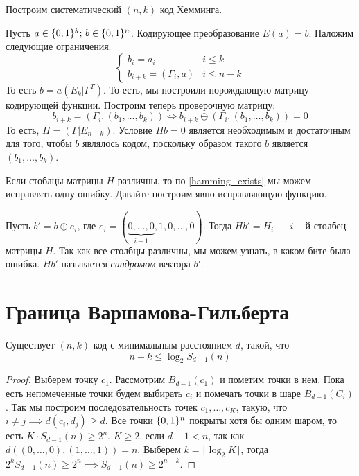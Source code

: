 \begin{example}
Построим систематический $(n,k)$ код Хемминга. 

Пусть $a \in \{0,1\}^k;\, b \in \{0,1\}^n$. Кодирующее преобразование $E(a) = b$.
Наложим следующие ограничения:
$$\left\{ \begin{array}{lr}
             b_i = a_i & i \le k \\
             b_{i+k} = (\Gamma_i, a) & i \le n-k
          \end{array}\right. $$
То есть $b = a (E_k | \Gamma^{T})$. То есть, мы построили порождающую матрицу
кодирующей функции. Построим теперь проверочную матрицу:
$$b_{i+k} = (\Gamma_i, (b_1, \ldots, b_k)) \iff 
 b_{i+k} \oplus (\Gamma_i, (b_1, \ldots, b_k)) = 0$$
То есть, $H = (\Gamma | E_{n-k})$. Условие $Hb = 0$ является необходимым и достаточным
для того, чтобы $b$ являлось кодом, поскольку образом такого $b$ является 
$(b_1, \ldots, b_k)$.

Если стоблцы матрицы $H$ различны, то по \ref{hamming_exists} мы можем исправлять 
одну ошибку. Давайте построим явно исправляющую функцию.

Пусть $b' = b \oplus e_i$, где $e_i = (\underbrace{0, \ldots, 0}_{i-1}, 1, 0, \ldots, 0)$.
Тогда $Hb' = H_i$ --- $i-й$ столбец матрицы $H$. Так как все столбцы различны,
мы можем узнать, в каком бите была ошибка. $Hb'$ называется
\emph{синдромом} вектора $b'$.
\end{example}

\section{Граница Варшамова-Гильберта}

\begin{theorem}
Существует $(n,k)$-код с минимальным расстоянием $d$, такой, что 
$$n-k \le \log_2 S_{d-1} (n)$$
\end{theorem}
\begin{proof}
Выберем точку $c_1$. Рассмотрим $B_{d-1}(c_1)$ и пометим точки в нем. Пока есть
непомеченные точки будем выбирать $c_i$ и помечать точки в шаре $B_{d-1}(C_i)$.
Так мы построим последовательность точек $c_1, \ldots, c_K$, такую, что 
$i\neq j \implies d(c_i, d_j) \ge d$. Все точки $\{0,1\}^n$ покрыты хотя бы одним шаром, то
есть $K \cdot S_{d-1}(n) \ge 2^n$. $K \ge 2$, если $d-1 < n$, так как 
$d((0,\ldots,0),(1,\ldots,1)) = n$. Выберем $k = \lceil \log_2 K \rceil$,
тогда $2^k S_{d-1}(n) \ge 2^n \implies S_{d-1}(n) \ge 2^{n-k}$.
\end{proof}

